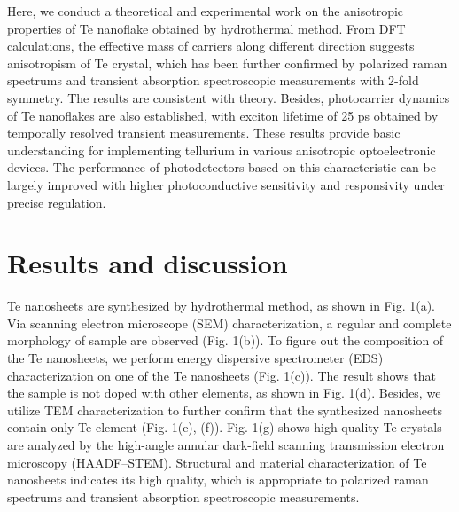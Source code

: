 \documentclass[journal=jacsat,manuscript=article]{achemso}
\begin{document}
Here, we conduct a theoretical and experimental work on the anisotropic properties of Te nanoflake obtained by hydrothermal method. From DFT calculations, the effective mass of carriers along different direction suggests anisotropism of Te crystal, which has been further confirmed by polarized raman spectrums and transient absorption spectroscopic measurements with 2-fold symmetry. The results are consistent with theory. Besides, photocarrier dynamics of Te nanoflakes are also established, with exciton lifetime of 25 ps obtained by temporally resolved transient measurements. These results provide basic understanding for implementing tellurium in various anisotropic optoelectronic devices. The performance of photodetectors based on this characteristic can be largely improved with  higher photoconductive sensitivity and responsivity under precise regulation.


\section{Results and discussion}
Te nanosheets are synthesized by hydrothermal method, as shown in Fig. 1(a). Via scanning electron microscope (SEM) characterization, a regular and complete morphology of sample are observed (Fig. 1(b)). To figure out the composition of the Te nanosheets, we perform energy dispersive spectrometer (EDS) characterization on one of the Te nanosheets (Fig. 1(c)). The result shows that the sample is not doped with other elements, as shown in Fig. 1(d). Besides, we utilize TEM characterization to further confirm that the synthesized nanosheets contain only Te element (Fig. 1(e), (f)). Fig. 1(g) shows high-quality Te crystals  are analyzed by the high-angle annular dark-field scanning transmission electron microscopy (HAADF–STEM). Structural and material characterization of Te nanosheets indicates its high quality, which is appropriate to polarized raman spectrums and transient absorption spectroscopic measurements.
\end{document}
